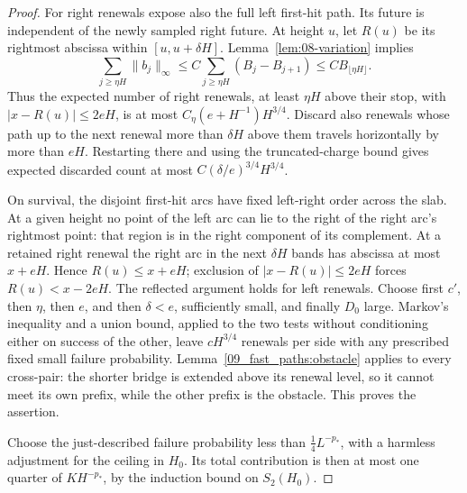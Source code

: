 \begin{proof}
For right renewals expose also the full left first-hit path.  Its
future is independent of the newly sampled right future.  At height
\(u\), let \(R(u)\) be its rightmost abscissa within
\([u,u+\delta H]\).  Lemma~\ref{lem:08-variation} implies
\[
 \sum_{j\ge\eta H}\|b_j\|_\infty
      \le C\sum_{j\ge\eta H}(B_j-B_{j+1})
      \le CB_{\lfloor\eta H\rfloor}.
\]
Thus the expected number of right renewals, at least \(\eta H\)
above their stop, with \(|x-R(u)|\le2eH\), is at most
\(C_\eta(e+H^{-1})H^{3/4}\).  Discard also renewals whose path
up to the next renewal more than \(\delta H\) above them travels
horizontally by more than \(eH\).  Restarting there and using the
truncated-charge bound gives expected discarded count at most
\(C(\delta/e)^{3/4}H^{3/4}\).

On survival, the disjoint first-hit arcs have fixed left-right order
across the slab.  At a given height no point of the left arc can lie
to the right of the right arc's rightmost point: that region is in
the right component of its complement.  At a retained right renewal
the right arc in the next \(\delta H\) bands has abscissa at most
\(x+eH\).  Hence \(R(u)\le x+eH\); exclusion of
\(|x-R(u)|\le2eH\) forces \(R(u)<x-2eH\).  The reflected argument
holds for left renewals.  Choose first \(c'\), then \(\eta\), then
\(e\), and then \(\delta<e\), sufficiently small, and finally
\(D_0\) large.  Markov's inequality and a union bound, applied to
the two tests without conditioning either on success of the other,
leave \(cH^{3/4}\) renewals per side with any prescribed fixed small
failure probability.  Lemma~\ref{09_fast_paths:obstacle} applies to
every cross-pair: the shorter bridge is extended above its renewal
level, so it cannot meet its own prefix, while the other prefix is
the obstacle.  This proves the assertion.

Choose the just-described failure probability less than
\(\tfrac14L^{-p_*}\), with a harmless adjustment for the ceiling in
\(H_0\).  Its total contribution is then at most one quarter of
\(KH^{-p_*}\), by the induction bound on \(S_2(H_0)\).


\end{proof}
